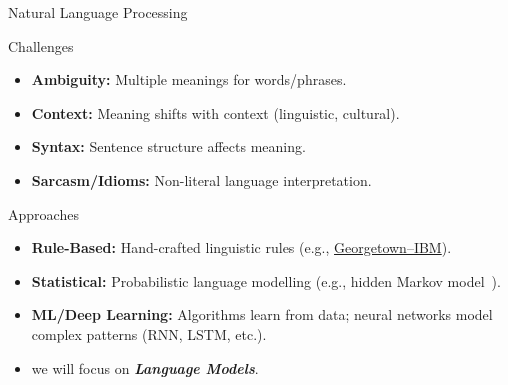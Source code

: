 \documentclass[presentation, 10pt]{beamer}\mode<presentation>{\usetheme{AMSBolognaFC}}
\begin{document}
\begin{frame}{Natural Language Processing}
    \begin{alertblock}{Challenges}
        \begin{itemize}
            \item \textbf{Ambiguity:} Multiple meanings for words/phrases.
            \item \textbf{Context:} Meaning shifts with context (linguistic, cultural).
            \item \textbf{Syntax:} Sentence structure affects meaning.
            \item \textbf{Sarcasm/Idioms:} Non-literal language interpretation.
        \end{itemize}
    \end{alertblock}
    
    \begin{exampleblock}{Approaches}
        \begin{itemize}
            \item \textbf{Rule-Based:} Hand-crafted linguistic rules (e.g., \href{https://en.wikipedia.org/wiki/Georgetown-IBM\_experiment}{Georgetown–IBM}).
            \item \textbf{Statistical:} Probabilistic language modelling (e.g., hidden Markov model~\cite{DBLP:journals/coling/Merialdo94}).
            \item \textbf{ML/Deep Learning:} Algorithms learn from data; neural networks model complex patterns (RNN, LSTM, etc.).
            \item[\faArrowRight] we will focus on \emph{\textbf{Language Models}}.
        \end{itemize}
    \end{exampleblock}
\end{frame}
\end{document}
